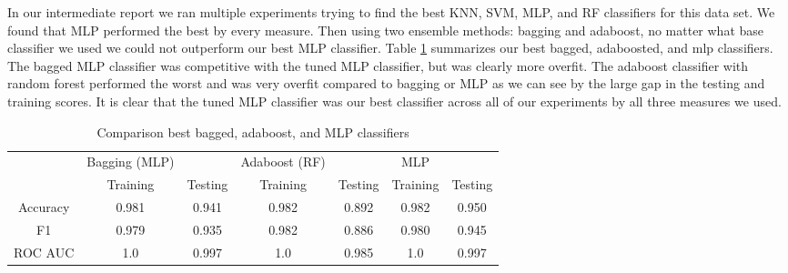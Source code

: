 \documentclass[12pt]{article}
\begin{document}
In our intermediate report we ran multiple experiments trying to find the best KNN, SVM, MLP, and RF classifiers for this data set. We found that MLP performed the best by every measure. Then using two ensemble methods: bagging and adaboost, no matter what base classifier we used we could not outperform our best MLP classifier. Table \ref{table: 16} summarizes our best bagged, adaboosted, and mlp classifiers. The bagged MLP classifier was competitive with the tuned MLP classifier, but was clearly more overfit. The adaboost classifier with random forest performed the worst and was very overfit compared to bagging or MLP as we can see by the large gap in the testing and training scores. It is clear that the tuned MLP classifier was our best classifier across all of our experiments by all three measures we used.


\begin{table}[h!]
	\centering
	\begin{tabular}{| c|cc|cc|cc|} 
		\hline
		&Bagging (MLP)&&Adaboost (RF)&&MLP&\\
		& Training & Testing& Training & Testing& Training & Testing\\ \hline
		Accuracy& 0.981 &0.941 & 0.982& 0.892 & 0.982&0.950 \\ 
		F1 & 0.979 &0.935 &  0.982 &0.886&  0.980 &0.945\\ 
		ROC AUC& 1.0 &0.997 & 1.0 & 0.985 & 1.0 &0.997\\
		\hline
	\end{tabular}
	\caption{Comparison best bagged, adaboost, and MLP classifiers}
	\label{table: 16}
\end{table}
\end{document}
